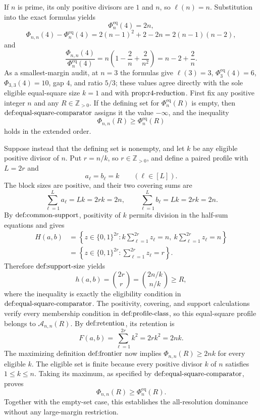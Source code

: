 If \(n\) is prime, its only positive divisors are \(1\) and \(n\), so \(\ell(n)=n\). Substitution into the exact formulas yields
\[
\Phi_n^{\mathrm{eq}}(4)=2n,
\]
\[
\Phi_{n,n}(4)-\Phi_n^{\mathrm{eq}}(4)
=2(n-1)^2+2-2n
=2(n-1)(n-2),
\]
and
\[
\frac{\Phi_{n,n}(4)}{\Phi_n^{\mathrm{eq}}(4)}
=n\left(1-\frac2n+\frac{2}{n^2}\right)
=n-2+\frac2n.
\]
As a smallest-margin audit, at \(n=3\) the formulas give \(\ell(3)=3\), \(\Phi_3^{\mathrm{eq}}(4)=6\), \(\Phi_{3,3}(4)=10\), gap \(4\), and ratio \(5/3\); these values agree directly with the sole eligible equal-square size \(k=1\) and with \(\textnormal{prop:r4-reduction}\).
First fix any positive integer \(n\) and any \(R\in\mathbb Z_{>0}\). If the defining set for \(\Phi_n^{\mathrm{eq}}(R)\) is empty, then \(\textnormal{def:equal-square-comparator}\) assigns it the value \(-\infty\), and the inequality
\[
\Phi_{n,n}(R)\ge\Phi_n^{\mathrm{eq}}(R)
\]
holds in the extended order.

Suppose instead that the defining set is nonempty, and let \(k\) be any eligible positive divisor of \(n\). Put \(r=n/k\), so \(r\in\mathbb Z_{>0}\), and define a paired profile with \(L=2r\) and
\[
a_\ell=b_\ell=k\qquad(\ell\in[L]).
\]
The block sizes are positive, and their two covering sums are
\[
\sum_{\ell=1}^{L}a_\ell=Lk=2rk=2n,
\qquad
\sum_{\ell=1}^{L}b_\ell=Lk=2rk=2n.
\]
By \(\textnormal{def:common-support}\), positivity of \(k\) permits division in the half-sum equations and gives
\[
\begin{aligned}
H(a,b)
&=\left\{z\in\{0,1\}^{2r}:k\sum_{\ell=1}^{2r}z_\ell=n,\ k\sum_{\ell=1}^{2r}z_\ell=n\right\}\\
&=\left\{z\in\{0,1\}^{2r}:\sum_{\ell=1}^{2r}z_\ell=r\right\}.
\end{aligned}
\]
Therefore \(\textnormal{def:support-size}\) yields
\[
h(a,b)=\binom{2r}{r}=\binom{2n/k}{n/k}\ge R,
\]
where the inequality is exactly the eligibility condition in \(\textnormal{def:equal-square-comparator}\). The positivity, covering, and support calculations verify every membership condition in \(\textnormal{def:profile-class}\), so this equal-square profile belongs to \(\mathcal A_{n,n}(R)\). By \(\textnormal{def:retention}\), its retention is
\[
F(a,b)=\sum_{\ell=1}^{2r}k^2=2rk^2=2nk.
\]
The maximizing definition \(\textnormal{def:frontier}\) now implies \(\Phi_{n,n}(R)\ge2nk\) for every eligible \(k\). The eligible set is finite because every positive divisor \(k\) of \(n\) satisfies \(1\le k\le n\). Taking its maximum, as specified by \(\textnormal{def:equal-square-comparator}\), proves
\[
\Phi_{n,n}(R)\ge\Phi_n^{\mathrm{eq}}(R).
\]
Together with the empty-set case, this establishes the all-resolution dominance without any large-margin restriction.

